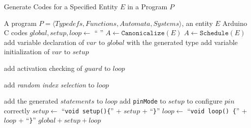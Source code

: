 \begin{algorithm}[ht]
    \caption{Generate Codes for a Specified Entity $E$ in a Program $P$}
    \label{alg:generate}
    \small
    \begin{algorithmic}[1]
        \REQUIRE A program $P=\langle Typedefs, Functions, Automata, Systems\rangle$, an entity $E$
        \ENSURE Arduino C codes
        \STATE $global, setup, loop\leftarrow$ ``\; ''
            \STATE $A \leftarrow \texttt{Canonicalize}(E)$
        \ELSE
            \STATE $A \leftarrow \texttt{Schedule}(E)$
        \ENDIF
        \ENDIF
            \STATE add variable declaration of $var$ to $global$ with the generated type
            \STATE add variable initialization of $var$ to $setup$
        \ENDFOR
        
            \STATE add activation checking of $guard$ to $loop$
        \ENDFOR

        \STATE add \emph{random index selection} to $loop$

            \STATE add the generated $statements$ to $loop$
                \STATE add \texttt{pinMode} to $setup$ to configure $pin$ correctly
            \ENDIF
        \ENDFOR
        \STATE $setup \leftarrow$ ``\texttt{void setup()\{}'' + $setup$ + ``\texttt{\}}''
        \STATE $loop \leftarrow$ ``\texttt{void loop() \{}'' + $loop$ + ``\texttt{\}}''
        \RETURN $global+setup+loop$
    \end{algorithmic}
\end{algorithm}